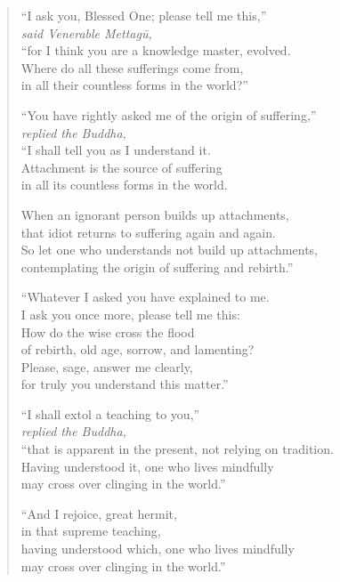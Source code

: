 \documentclass[12pt,openany]{book}%
\newcommand*{\scspeaker}[1]{\hspace{2em}\textit{#1}}
\begin{document}
\begin{verse}%
“I ask you, Blessed One; please tell me this,” \\
\scspeaker{said Venerable \textsanskrit{Mettagū}, }\\
“for I think you are a knowledge master, evolved. \\
Where do all these sufferings come from, \\
in all their countless forms in the world?” 

“You have rightly asked me of the origin of suffering,” \\
\scspeaker{replied the Buddha, }\\
“I shall tell you as I understand it. \\
Attachment is the source of suffering \\
in all its countless forms in the world. 

When an ignorant person builds up attachments, \\
that idiot returns to suffering again and again. \\
So let one who understands not build up attachments, \\
contemplating the origin of suffering and rebirth.” 

“Whatever I asked you have explained to me. \\
I ask you once more, please tell me this: \\
How do the wise cross the flood \\
of rebirth, old age, sorrow, and lamenting? \\
Please, sage, answer me clearly, \\
for truly you understand this matter.” 

“I shall extol a teaching to you,” \\
\scspeaker{replied the Buddha, }\\
“that is apparent in the present, not relying on tradition. \\
Having understood it, one who lives mindfully \\
may cross over clinging in the world.” 

“And I rejoice, great hermit, \\
in that supreme teaching, \\
having understood which, one who lives mindfully \\
may cross over clinging in the world.” 


\end{verse}
\end{document}
